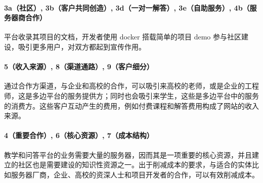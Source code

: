 \documentclass[a4paper]{ctexart}
\begin{document}
\paragraph{3a（社区）, 3b（客户共同创造）, 3d（一对一解答）, 3e（自助服务）, 4b（服务器商合作）}平台收录其项目的文档，开发者使用 docker 搭载简单的项目 demo 参与社区建设，吸引更多用户，对双方都起到宣传作用。
\paragraph{5（收入来源）, 8（渠道通路）, 9（客户细分）}通过合作方渠道，与企业和高校的合作，可以吸引来高校的老师，或是企业的工程师，这是多边平台的服务提供方；同时也会吸引来学生，这些是多边平台中的服务的消费方。这些客户互动产生的费用，例如付费课程和解答费用构成了网站的收入来源。
\paragraph{4（重要合作）, 6（核心资源）, 7（成本结构）}教学和问答平台的业务需要大量的服务器，因而其是一项重要的核心资源，并且建立的社区也是需要建设的知识性资源之一。出于削减成本的要求，与适合的实体比如服务器厂商，企业、高校的资深人士和项目开发者的合作，可以有效削减成本。
\end{document}

